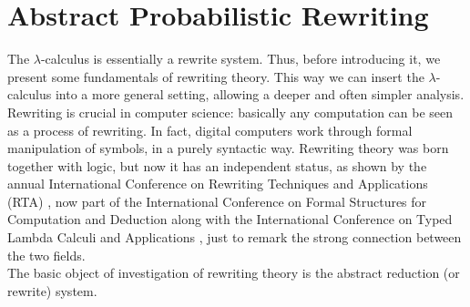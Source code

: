 \chapter{Abstract Probabilistic Rewriting}\label{ch:mathtest} %
The $\lambda$-calculus is essentially a rewrite system. Thus, before introducing it, we present some fundamentals of rewriting theory. This way we can insert the $\lambda$-calculus into a more general setting, allowing a deeper and often simpler analysis. Rewriting is crucial in computer science: basically any computation can be seen as a process of rewriting. In fact, digital computers work through formal manipulation of symbols, in a purely syntactic way. Rewriting theory was born together with logic, but now it has an independent status, as shown by the annual International Conference on Rewriting Techniques and Applications (RTA) \cite{noauthor_rta_nodate}, now part of the International Conference on Formal Structures for Computation and Deduction along with the  International Conference on Typed Lambda Calculi and Applications \cite{noauthor_notitle_nodate}, just to remark the strong connection between the two fields.\\
The basic object of investigation of rewriting theory is the abstract reduction (or rewrite) system. 

